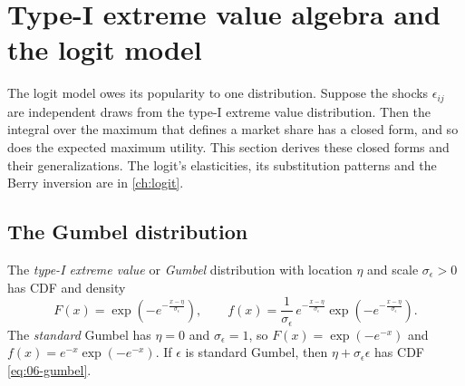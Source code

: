 \section{Type-I extreme value algebra and the logit model}\label{sec:06-tiev}

The logit model owes its popularity to one distribution. Suppose the shocks $\epsilon_{ij}$ are independent
draws from the type-I extreme value distribution. Then the integral over the maximum that defines a market
share has a closed form, and so does the expected maximum utility. This section derives these closed forms and their
generalizations. The logit's elasticities, its substitution patterns and the Berry inversion are in
\cref{ch:logit}.

\subsection{The Gumbel distribution}\label{sec:06-gumbel}

The \emph{type-I extreme value} or \emph{Gumbel} distribution with location $\eta$ and scale $\sigma_\epsilon > 0$
has CDF and density
\begin{equation}\label{eq:06-gumbel}
F(x) = \exp\left(-e^{-\frac{x - \eta}{\sigma_\epsilon}}\right), \qquad
f(x) = \frac{1}{\sigma_\epsilon}\,e^{-\frac{x - \eta}{\sigma_\epsilon}}\exp\left(-e^{-\frac{x - \eta}{\sigma_\epsilon}}\right).
\end{equation}
The \emph{standard} Gumbel has $\eta = 0$ and $\sigma_\epsilon = 1$, so $F(x) = \exp(-e^{-x})$ and
$f(x) = e^{-x}\exp(-e^{-x})$. If $\epsilon$ is standard Gumbel, then $\eta + \sigma_\epsilon\epsilon$ has CDF
\eqref{eq:06-gumbel}.

